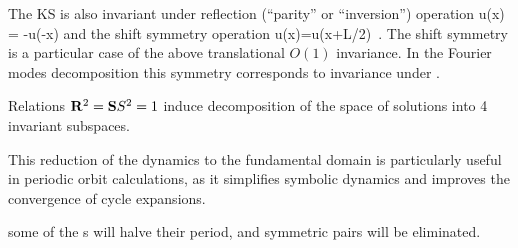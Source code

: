 The KS is also invariant under
reflection (``parity'' or ``inversion'') operation
\beq
\Refl u(x) = -u(-x)
and the shift symmetry operation 
\beq
\Shift u(x)=u(x+L/2)
\,. 
The shift symmetry is a particular case of the
above translational $O(1)$ invariance.
In the Fourier modes decomposition  this
symmetry corresponds to invariance under
.

Relations $\mathbf{R}^2=\mathbf{S}{S}^2=1$
induce decomposition of the space of solutions into 4 invariant
subspaces.

This reduction of the dynamics to the fundamental domain is particularly
useful in periodic orbit calculations, as it simplifies symbolic dynamics
and improves the convergence of cycle expansions\cite{CvitaEckardt}.

some of the \po s will
halve their period, and symmetric pairs will be eliminated.



